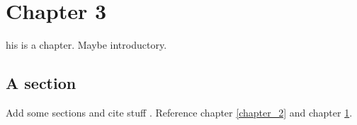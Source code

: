 \chapter{Chapter 3}\label{chapter_3}


his is a chapter. Maybe introductory. \lipsum[1-2] 

\section{A section}
Add some sections and cite stuff \cite{citation1}. Reference chapter \ref{chapter_2} and chapter \ref{chapter_3}. 